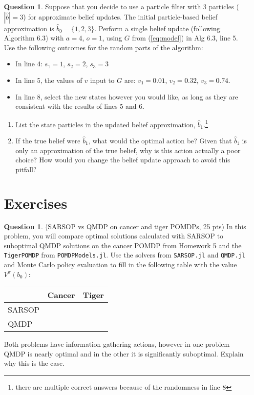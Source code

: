 \documentclass{article}
\theoremstyle{definition}
\newtheorem{question}[thm]{Question}
\begin{document}
\begin{question}
Suppose that you decide to use a particle filter with 3 particles ($|\hat{b}|=3$) for approximate belief updates. The initial particle-based belief approximation is $\hat{b}_0 = \{1, 2, 3\}$. Perform a single belief update (following Algorithm 6.3) with $a=4$, $o=1$, using $G$ from (\ref{eq:model}) in Alg 6.3, line 5. Use the following outcomes for the random parts of the algorithm:
\begin{itemize}[noitemsep]
    \item In line 4: $s_1 = 1$, $s_2 = 2$, $s_3 = 3$
    \item In line 5, the values of $v$ input to $G$ are: $v_1 = 0.01$, $v_2 = 0.32$, $v_3=0.74$.
    \item In line 8, select the new states however you would like, as long as they are consistent with the results of lines 5 and 6.
\end{itemize}

\begin{enumerate}[label=(\alph*)]
    \item List the state particles in the updated belief approximation, $\hat{b}_1$.\footnote{there are multiple correct answers because of the randomness in line 8}
    \item If the true belief were $\hat{b}_1$, what would the optimal action be? Given that $\hat{b}_1$ is only an approximation of the true belief, why is this action actually a poor choice? How would you change the belief update approach to avoid this pitfall?
\end{enumerate}

\end{question}

\section{Exercises}

\begin{question}
    (SARSOP vs QMDP on cancer and tiger POMDPs, 25 pts) In this problem, you will compare optimal solutions calculated with SARSOP to suboptimal QMDP solutions on the cancer POMDP from Homework 5 and the \texttt{TigerPOMDP} from \texttt{POMDPModels.jl}. Use the solvers from \texttt{SARSOP.jl} and \texttt{QMDP.jl} and Monte Carlo policy evaluation to fill in the following table with the value $V^\pi(b_0)$:\\
    \begin{tabular}{l|c|c}
               & Cancer & Tiger \\
        \midrule
        SARSOP &        &       \\
        \midrule
        QMDP   &        &
    \end{tabular}

Both problems have information gathering actions, however in one problem QMDP is nearly optimal and in the other it is significantly suboptimal. Explain why this is the case.
\end{question}
\end{document}
